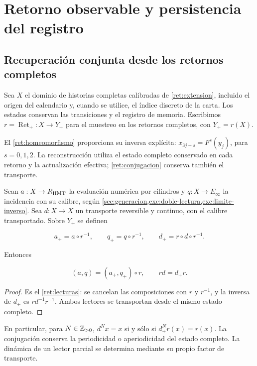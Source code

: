 \section{Retorno observable y persistencia del registro}
\label{nuclear:9}
\subsection{Recuperación conjunta desde los retornos completos}

Sea \(X\) el dominio de historias completas calibradas de
\cref{ret:extension}, incluido el origen del calendario y, cuando se
utilice, el índice discreto de la carta. Los estados conservan las
transiciones y el registro de memoria. Escribimos
\(r=\operatorname{Ret}_+:X\to Y_+\) para el muestreo en los retornos
completos, con \(Y_+=r(X)\).

El \cref{ret:homeomorfismo} proporciona su inversa explícita:
\(x_{3j+s}=F^s(y_j)\), para \(s=0,1,2\). La reconstrucción utiliza
el estado completo conservado en cada retorno y la actualización
efectiva; \eqref{ret:conjugacion} conserva también el transporte.

Sean \(a:X\to R_{\rm HMT}\) la evaluación numérica por cilindros y
\(q:X\to E_\infty\) la incidencia con su calibre, según
\cref{sec:generacion,exc:doble-lectura,exc:limite-inverso}.
Sea \(d:X\to X\) un transporte reversible y continuo, con el calibre
transportado. Sobre \(Y_+\) se definen



\[
a_+=a\circ r^{-1},\qquad q_+=q\circ r^{-1},\qquad d_+=r\circ d\circ r^{-1}.
\]



Entonces



\begin{equation}
\boxed{(a,q)=(a_+,q_+)\circ r,\qquad rd=d_+r.}
\label{nuc09:lecturas}
\end{equation}



\begin{proof}
Es el \cref{ret:lecturas}: se cancelan las composiciones con \(r\)
y \(r^{-1}\), y la inversa de \(d_+\) es \(rd^{-1}r^{-1}\).
Ambos lectores se transportan desde el mismo estado completo.
\end{proof}

En particular, para \(N\in\mathbb Z_{>0}\),
\(d^Nx=x\) si y sólo si \(d_+^Nr(x)=r(x)\).
La conjugación conserva la periodicidad o aperiodicidad del estado
completo. La dinámica de un lector parcial se determina mediante
su propio factor de transporte.

